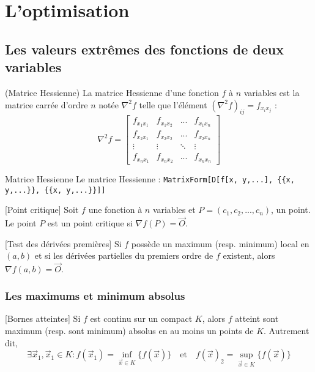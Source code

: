\section{L'optimisation}
	\subsection{Les valeurs extrêmes des fonctions de deux variables}
		\begin{mydef}(Matrice Hessienne)
			La matrice Hessienne d'une fonction $f$ à $n$ variables est la matrice carrée d'ordre $n$ notée $\nabla^2 f$ telle que l'élément $(\nabla^2 f)_{ij} = f_{x_i x_j}$ : 
			\[\nabla^2 f=\begin{bmatrix}
			f_{x_1 x_1} &f_{x_1 x_2} & ... &f_{x_1 x_n}\\
			f_{x_2 x_1} &f_{x_2 x_2} & ... &f_{x_2 x_n}\\
			\vdots &\vdots & \ddots &\vdots\\
			f_{x_n x_1} &f_{x_n x_2} & ... &f_{x_n x_n}
			\end{bmatrix}\]
		\end{mydef}	
		\begin{code}{Matrice Hessienne}
			Le matrice Hessienne : \verb|MatrixForm[D[f[x, y,...], {{x, y,...}}, {{x, y,...}}]]| 
		\end{code}
		\begin{mydef}[Point critique]
			Soit $f$ une fonction à $n$ variables et $P=(c_1,c_2,...,c_n)$, un point. Le point $P$ est un point critique si $\nabla f (P)=\vec{O}$.
		\end{mydef}
		\begin{mythm}[Test des dérivées premières]
			Si $f$ possède un maximum (resp. minimum) local en $(a,b)$ et si les dérivées partielles du premiers ordre de $f$ existent, alors $\nabla f(a,b)=\vec{O}.$
		\end{mythm}
		\subsubsection*{Les maximums et minimum absolus}
			\begin{mythm}[Bornes atteintes]
				Si $f$ est continu sur un compact $K$, alors $f$ atteint sont maximum (resp. sont minimum) absolus en au moins un points de $K$. Autrement dit, \[\exists \vec{x}_1,\vec{x}_1\in K : f(\vec{x}_1)=\inf_{\vec{x}\in K}\{f(\vec{x})\}\quad\text{et}\quad f(\vec{x})_2=\sup_{\vec{x}\in K}\{f(\vec{x})\}\]
			\end{mythm}
